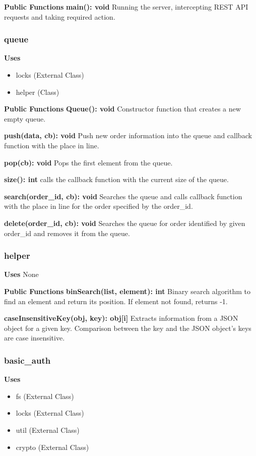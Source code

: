 \documentclass [10pt]{article}
\begin{document}
\textbf{Public Functions}
\textbf{main(): void}
Running the server, intercepting REST API requests and taking required action.

\subsubsection{queue}
\textbf{Uses}
\begin{itemize}
	\item locks (External Class)
	\item helper (Class)
\end{itemize}

\textbf{Public Functions}
\textbf{Queue(): void}
Constructor function that creates a new empty queue.

\textbf{push(data, cb): void}
Push new order information into the queue and callback function with the place in line.

\textbf{pop(cb): void}
Pops the first element from the queue.

\textbf{size(): int}
calls the callback function with the current size of the queue.

\textbf{search(order\_id, cb): void}
Searches the queue and calls callback function with the place in line for the order specified by the order\_id.

\textbf{delete(order\_id, cb): void}
Searches the queue for order identified by given order\_id and removes it from the queue.

\subsubsection{helper}
\textbf{Uses}
None

\textbf{Public Functions}
\textbf{binSearch(list, element): int}
Binary search algorithm to find an element and return its position. If element not found, returns -1.

\textbf{caseInsensitiveKey(obj, key): obj[i]}
Extracts information from a JSON object for a given key. Comparison between the key and the JSON object's keys are case insensitive.

\subsubsection{basic\_auth}
\textbf{Uses}
\begin{itemize}
	\item fs (External Class)
	\item locks (External Class)
	\item util (External Class)
	\item crypto (External Class)
\end{itemize}
\end{document}
